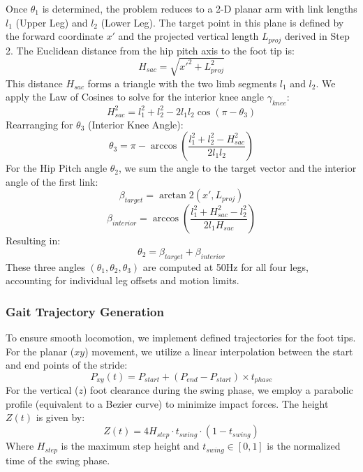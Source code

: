 \documentclass[pdflatex,sn-mathphys-num]{sn-jnl}%
\theoremstyle{thmstyleone}%
\theoremstyle{thmstyletwo}%
\theoremstyle{thmstylethree}%
\begin{document}
Once $\theta_1$ is determined, the problem reduces to a 2-D planar arm with link lengths $l_1$ (Upper Leg) and $l_2$ (Lower Leg). The target point in this plane is defined by the forward coordinate $x'$ and the projected vertical length $L_{proj}$ derived in Step 2.
The Euclidean distance from the hip pitch axis to the foot tip is:
\begin{equation}
    H_{sac} = \sqrt{x'^2 + L_{proj}^2}
\end{equation}
This distance $H_{sac}$ forms a triangle with the two limb segments $l_1$ and $l_2$. We apply the Law of Cosines to solve for the interior knee angle $\gamma_{knee}$:
\begin{equation}
    H_{sac}^2 = l_1^2 + l_2^2 - 2 l_1 l_2 \cos(\pi - \theta_3)
\end{equation}
Rearranging for $\theta_3$ (Interior Knee Angle):
\begin{equation}
    \theta_3 = \pi - \arccos\left( \frac{l_1^2 + l_2^2 - H_{sac}^2}{2 l_1 l_2} \right)
\end{equation}
For the Hip Pitch angle $\theta_2$, we sum the angle to the target vector and the interior angle of the first link:
\begin{equation}
    \beta_{target} = \arctan2(x', L_{proj})
\end{equation}
\begin{equation}
    \beta_{interior} = \arccos\left( \frac{l_1^2 + H_{sac}^2 - l_2^2}{2 l_1 H_{sac}} \right)
\end{equation}
Resulting in:
\begin{equation}
    \theta_2 = \beta_{target} + \beta_{interior}
\end{equation}
These three angles $(\theta_1, \theta_2, \theta_3)$ are computed at 50Hz for all four legs, accounting for individual leg offsets and motion limits.


\subsubsection{Gait Trajectory Generation}
To ensure smooth locomotion, we implement defined trajectories for the foot tips. For the planar ($xy$) movement, we utilize a linear interpolation between the start and end points of the stride:
\begin{equation}
    P_{xy}(t) = P_{start} + (P_{end} - P_{start}) \times t_{phase}
\end{equation}
For the vertical ($z$) foot clearance during the swing phase, we employ a parabolic profile (equivalent to a Bezier curve) to minimize impact forces. The height $Z(t)$ is given by:
\begin{equation}
    Z(t) = 4 H_{step} \cdot t_{swing} \cdot (1 - t_{swing})
\end{equation}
Where $H_{step}$ is the maximum step height and $t_{swing} \in [0, 1]$ is the normalized time of the swing phase.
\end{document}
